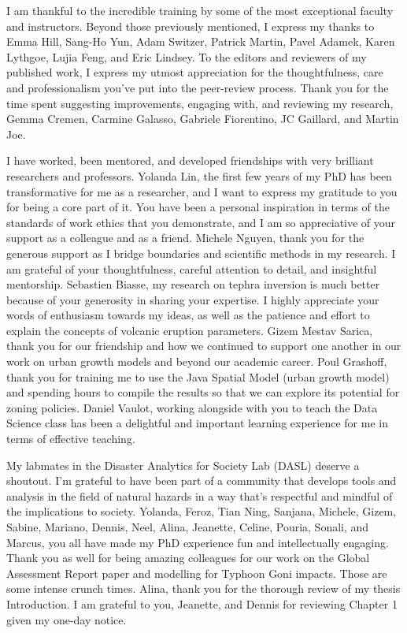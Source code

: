 {I am thankful to the incredible training by some of the most exceptional faculty and instructors. Beyond those previously mentioned, I express my thanks to Emma Hill, Sang-Ho Yun, Adam Switzer, Patrick Martin, Pavel Adamek, Karen Lythgoe, Lujia Feng, and Eric Lindsey. To the editors and reviewers of my published work, I express my utmost appreciation for the thoughtfulness, care and professionalism you’ve put into the peer-review process. Thank you for the time spent suggesting improvements, engaging with, and reviewing my research, Gemma Cremen, Carmine Galasso, Gabriele Fiorentino, JC Gaillard, and Martin Joe.

I have worked, been mentored, and developed friendships with very brilliant researchers and professors. Yolanda Lin, the first few years of my PhD has been transformative for me as a researcher, and I want to express my gratitude to you for being a core part of it. You have been a personal inspiration in terms of the standards of work ethics that you demonstrate, and I am so appreciative of your support as a colleague and as a friend. Michele Nguyen, thank you for the generous support as I bridge boundaries and scientific methods in my research. I am grateful of your thoughtfulness, careful attention to detail, and insightful mentorship. Sebastien Biasse, my research on tephra inversion is much better because of your generosity in sharing your expertise. I highly appreciate your words of enthusiasm towards my ideas, as well as the patience and effort to explain the concepts of volcanic eruption parameters.  Gizem Mestav Sarica, thank you for our friendship and how we continued to support one another in our work on urban growth models and beyond our academic career. Poul Grashoff, thank you for training me to use the Java Spatial Model (urban growth model) and spending hours to compile the results so that we can explore its potential for zoning policies. Daniel Vaulot, working alongside with you to teach the Data Science class has been a delightful and important learning experience for me in terms of effective teaching. 

My labmates in the Disaster Analytics for Society Lab (DASL) deserve a shoutout. I'm grateful to have been part of a community that develops tools and analysis in the field of natural hazards in a way that's respectful and mindful of the implications to society. Yolanda, Feroz, Tian Ning, Sanjana, Michele, Gizem, Sabine, Mariano, Dennis, Neel, Alina, Jeanette, Celine, Pouria, Sonali, and Marcus, you all have made my PhD experience fun and intellectually engaging. Thank you as well for being amazing colleagues for our work on the Global Assessment Report paper and modelling for Typhoon Goni impacts. Those are some intense crunch times. Alina, thank you for the thorough review of my thesis Introduction. I am grateful to you, Jeanette, and Dennis for reviewing Chapter 1 given my one-day notice.

}
